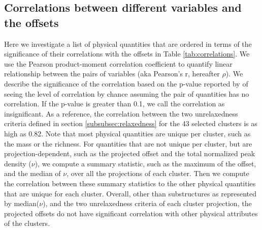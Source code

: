 \subsection{Correlations between different variables and the offsets}
\label{subsec:correlations}
Here we investigate a list of physical quantities that are ordered in terms of
the significance of their correlations with the offsets in Table \ref{tab:correlations}. 
We use the Pearson product-moment correlation coefficient to quantify linear 
relationship between the pairs of variables
(aka Pearson's r,  hereafter $\rho$).
We describe the significance of the correlation 
based on the p-value reported by {} of seeing the level of 
correlation by chance assuming the pair of 
quantities has no correlation. If the p-value is greater than 0.1, we call the
correlation as insignificant.
As a reference, the correlation between the 
two unrelaxedness criteria defined in section \ref{subsubsec:relaxedness}
for the 43 selected clusters is as high as 0.82. 
Note that most physical quantities are unique per cluster, such as the mass or
the richness.
For quantities that are not unique per cluster, but are projection-dependent,
such as the projected offset and the total normalized peak density ($\nu$), 
we compute a summary statistic, such as the
maximum of the offset, and the median of $\nu$, over all the projections of
each cluster. 
Then we compute the correlation between these summary statistics to the other physical quantities that
are unique for each cluster.
Overall, other than substructures as represented by median($\nu$), and the two
unrelaxedness criteria of each cluster
projection, the projected offsets do not have significant correlation 
with other physical attributes of the clusters.


